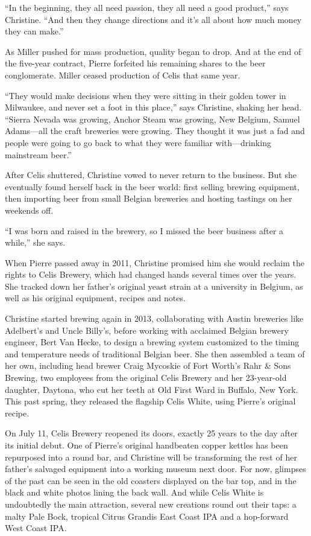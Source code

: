 \documentclass[a4paper,parskip=half]{scrartcl}
\begin{document}
“In the beginning, they all need passion, they all need a good product,” says Christine. “And then they change directions and it’s all about how much money they can make.”

As Miller pushed for mass production, quality began to drop. And at the end of the five-year contract, Pierre forfeited his remaining shares to the beer conglomerate. Miller ceased production of Celis that same year.

“They would make decisions when they were sitting in their golden tower in Milwaukee, and never set a foot in this place,” says Christine, shaking her head. “Sierra Nevada was growing, Anchor Steam was growing, New Belgium, Samuel Adams—all the craft breweries were growing. They thought it was just a fad and people were going to go back to what they were familiar with—drinking mainstream beer.”

After Celis shuttered, Christine vowed to never return to the business. But she eventually found herself back in the beer world: first selling brewing equipment, then importing beer from small Belgian breweries and hosting tastings on her weekends off.

“I was born and raised in the brewery, so I missed the beer business after a while,” she says.

When Pierre passed away in 2011, Christine promised him she would reclaim the rights to Celis Brewery, which had changed hands several times over the years. She tracked down her father’s original yeast strain at a university in Belgium, as well as his original equipment, recipes and notes.

Christine started brewing again in 2013, collaborating with Austin breweries like Adelbert’s and Uncle Billy’s, before working with acclaimed Belgian brewery engineer, Bert Van Hecke, to design a brewing system customized to the timing and temperature needs of traditional Belgian beer. She then assembled a team of her own, including head brewer Craig Mycoskie of Fort Worth’s Rahr \& Sons Brewing, two employees from the original Celis Brewery and her 23-year-old daughter, Daytona, who cut her teeth at Old First Ward in Buffalo, New York. This past spring, they released the flagship Celis White, using Pierre’s original recipe.

On July 11, Celis Brewery reopened its doors, exactly 25 years to the day after its initial debut. One of Pierre’s original handbeaten copper kettles has been repurposed into a round bar, and Christine will be transforming the rest of her father’s salvaged equipment into a working museum next door. For now, glimpses of the past can be seen in the old coasters displayed on the bar top, and in the black and white photos lining the back wall. And while Celis White is undoubtedly the main attraction, several new creations round out their taps: a malty Pale Bock, tropical Citrus Grandis East Coast IPA and a hop-forward West Coast IPA.
\end{document}
